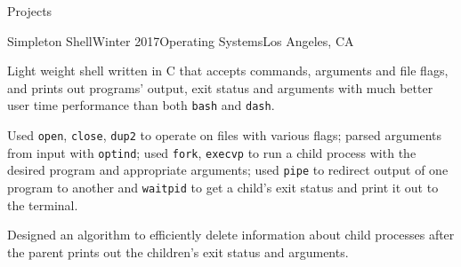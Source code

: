\documentclass{resume} %
\begin{document}

\begin{rSection}{Projects}

\begin{rSubsection}{Simpleton Shell}{Winter 2017}{Operating Systems}{Los Angeles, CA}
\item {Light weight shell written in C that accepts commands, arguments and file flags, and prints out programs' output, exit status and arguments with much better user time performance than both \texttt{bash} and \texttt{dash}.}
\item {Used \texttt{open}, \texttt{close}, \texttt{dup2} to operate on files with various flags; parsed arguments from input with \texttt{optind}; used \texttt{fork}, \texttt{execvp} to run a child process with the desired program and appropriate arguments; used \texttt{pipe} to redirect output of one program to another and \texttt{waitpid} to get a child's exit status and print it out to the terminal.}
\item {Designed an algorithm to efficiently delete information about child processes after the parent prints out the children's exit status and arguments.}
\end{rSubsection}


\end{rSection}

\end{document}
